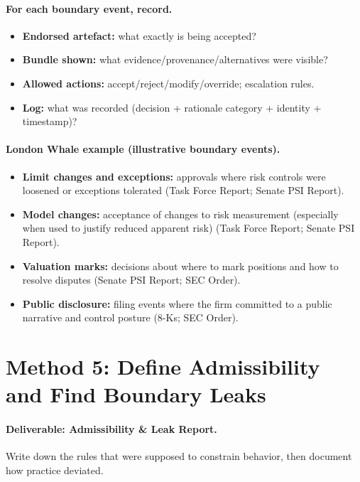 \paragraph{For each boundary event, record.}
\begin{itemize}
  \item \textbf{Endorsed artefact:} what exactly is being accepted?
  \item \textbf{Bundle shown:} what evidence/provenance/alternatives were visible?
  \item \textbf{Allowed actions:} accept/reject/modify/override; escalation rules.
  \item \textbf{Log:} what was recorded (decision + rationale category + identity + timestamp)?
\end{itemize}

\paragraph{London Whale example (illustrative boundary events).}
\begin{itemize}
  \item \textbf{Limit changes and exceptions:} approvals where risk controls were loosened or exceptions tolerated (Task Force Report; Senate PSI Report).
  \item \textbf{Model changes:} acceptance of changes to risk measurement (especially when used to justify reduced apparent risk) (Task Force Report; Senate PSI Report).
  \item \textbf{Valuation marks:} decisions about where to mark positions and how to resolve disputes (Senate PSI Report; SEC Order).
  \item \textbf{Public disclosure:} filing events where the firm committed to a public narrative and control posture (8-Ks; SEC Order).
\end{itemize}

\section{Method 5: Define Admissibility and Find Boundary Leaks}
\label{sec:m5-leaks}

\paragraph{Deliverable: Admissibility \& Leak Report.}
Write down the rules that were supposed to constrain behavior, then document how practice deviated.

